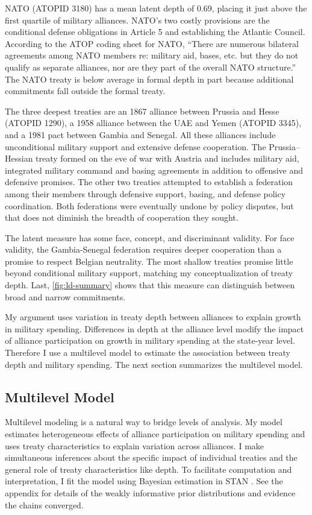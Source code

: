 \documentclass[12pt]{article}
\begin{document}
NATO (ATOPID 3180) has a mean latent depth of 0.69, placing it just above the first quartile of military alliances. 
NATO's two costly provisions are the conditional defense obligations in Article 5 and establishing the Atlantic Council. 
According to the ATOP coding sheet for NATO, ``There are numerous bilateral agreements among NATO members re: military aid, bases, etc. but they do not qualify as separate alliances, nor are they part of the overall NATO structure.''
The NATO treaty is below average in formal depth in part because additional commitments fall outside the formal treaty.    


The three deepest treaties are an 1867 alliance between Prussia and Hesse (ATOPID 1290), a 1958 alliance between the UAE and Yemen (ATOPID 3345), and a 1981 pact between Gambia and Senegal. 
All these alliances include unconditional military support and extensive defense cooperation. 
The Prussia--Hessian treaty formed on the eve of war with Austria and includes military aid, integrated military command and basing agreements in addition to offensive and defensive promises. 
The other two treaties attempted to establish a federation among their members through defensive support, basing, and defense policy coordination. 
Both federations were eventually undone by policy disputes, but that does not diminish the breadth of cooperation they sought. 


The latent measure has some face, concept, and discriminant validity. 
For face validity, the Gambia-Senegal federation requires deeper cooperation than a promise to respect Belgian neutrality. 
The most shallow treaties promise little beyond conditional military support, matching my conceptualization of treaty depth. 
Last, \autoref{fig:ld-summary} shows that this measure can distinguish between broad and narrow commitments. 


My argument uses variation in treaty depth between alliances to explain growth in military spending.
Differences in depth at the alliance level modify the impact of alliance participation on growth in military spending at the state-year level. 
Therefore I use a multilevel model to estimate the association between treaty depth and military spending.  
The next section summarizes the multilevel model. 


\subsection{Multilevel Model} 


Multilevel modeling is a natural way to bridge levels of analysis.
My model estimates heterogeneous effects of alliance participation on military spending and uses treaty characteristics to explain variation across alliances. 
I make simultaneous inferences about the specific impact of individual treaties and the general role of treaty characteristics like depth. 
To facilitate computation and interpretation, I fit the model using Bayesian estimation in STAN \citep{Carpenteretal2016}. 
See the appendix for details of the weakly informative prior distributions and evidence the chains converged.
\end{document}
